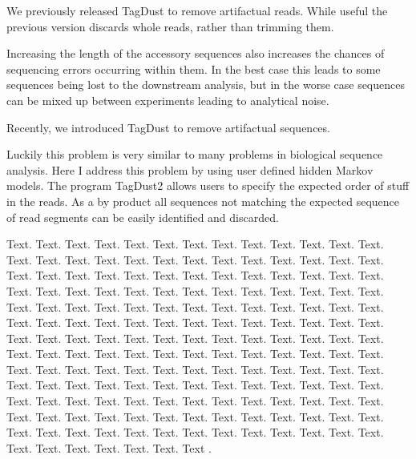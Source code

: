 \documentclass[a4,center,fleqn]{NAR}
\begin{document}
We previously released TagDust to remove artifactual reads. While useful the previous version discards whole reads, rather than trimming them.  

Increasing the length of the accessory sequences also increases the chances of sequencing errors occurring within them. In the best case this leads to some sequences being lost to the downstream analysis, but in the worse case sequences can be mixed up between experiments leading to analytical noise. 

Recently, we introduced TagDust to remove artifactual sequences.

Luckily this problem is very similar to many problems in biological sequence analysis. Here I address this problem by using user defined hidden Markov models. The program TagDust2 allows users to specify the expected order of stuff in the reads. As a by product all sequences not matching the expected sequence of read segments can be easily identified and discarded. 
\enlargethispage{-65.1pt}

Text. Text. Text. Text. Text. Text.
Text. Text. Text. Text. Text. Text. Text. Text. Text. Text. Text.
Text. Text. Text. Text. Text. Text. Text. Text. Text. Text. Text.
Text. Text. Text. Text. Text. Text. Text. Text. Text. Text. Text.
Text. Text. Text. Text. Text. Text. Text. Text. Text. Text. Text.
Text. Text. Text. Text. Text. Text. Text. Text. Text. Text. Text.
Text. Text. Text. Text. Text. Text. Text. Text. Text. Text. Text.
Text. Text. Text. Text. Text. Text. Text. Text. Text. Text. Text.
Text. Text. Text. Text. Text. Text. Text. Text. Text. Text. Text.
Text. Text. Text. Text. Text. Text. Text. Text. Text. Text. Text.
Text. Text. Text. Text. Text. Text. Text. Text. Text. Text. Text.
Text. Text. Text. Text. Text. Text. Text. Text. Text. Text. Text.
Text. Text. Text. Text. Text. Text. Text. Text. Text. Text. Text.
Text. Text. Text. Text. Text. Text. Text. Text. Text. Text. Text.
Text. Text. Text. Text. Text. Text. Text. Text. Text. Text. Text.
Text. Text. Text. Text. Text. Text. Text. Text. Text. Text. Text.
Text. Text. Text. Text.
Text \cite{2,3}.
\end{document}

